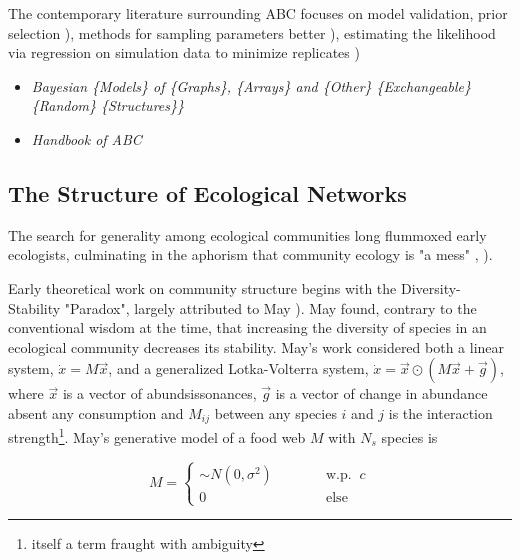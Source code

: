 \documentclass[]{article}
\begin{document}
The contemporary literature surrounding ABC focuses on model validation,
prior selection \citep{jacobs_unified_2014}), methods for sampling
parameters better \citep{beaumont_adaptive_2009}), estimating the
likelihood via regression on simulation data to minimize replicates
\citep{beaumont_approximate_2019})

\begin{itemize}
\item
  \emph{Bayesian \{Models\} of \{Graphs\}, \{Arrays\} and \{Other\}
  \{Exchangeable\} \{Random\} \{Structures\}\}}
  \citep{orbanz_bayesian_2015}
\item
  \emph{Handbook of ABC} \citep{sisson_handbook_2018}
\end{itemize}


\hypertarget{the-structure-of-ecological-networks}{%
\subsection{The Structure of Ecological
Networks}\label{the-structure-of-ecological-networks}}

The search for generality among ecological communities long flummoxed
early ecologists, culminating in the aphorism that community ecology is
"a mess" \citep{citation_original}, \citep{vellend_conceptual_2010}).

Early theoretical work on community structure begins with the
Diversity-Stability "Paradox", largely attributed to May \citep{may_will_1972,may_stability_2001}). May found, contrary
to the conventional wisdom at the time, that increasing the diversity of
species in an ecological community decreases its stability. May's work
considered both a linear system, \(\dot{x} = M\vec{x}\), and a
generalized Lotka-Volterra system,
\(\dot{x} = \vec{x} \odot (M \vec{x} + \vec{g})\), where \(\vec{x}\) is
a vector of abundsissonances, \(\vec{g}\) is a vector of change in abundance
absent any consumption and \(M_{ij}\) between any species \(i\) and
\(j\) is the interaction strength\footnote{itself a term fraught with
  ambiguity}. May's generative model of a food web \(M\) with \(N_s\)
species is

\[M = \begin{cases}\sim N(0, \sigma^2) \quad\quad\quad &\text{w.p. }\ c\\ 0 &\text{else}\end{cases}\]
\end{document}
